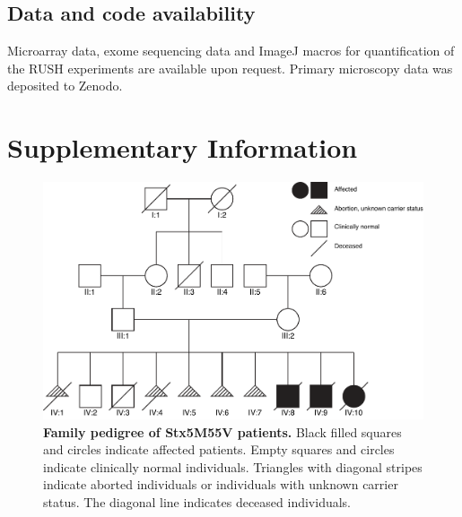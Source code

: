 \subsection{Data and code availability}

Microarray data, exome sequencing data and ImageJ macros for quantification of the RUSH experiments are available upon request. Primary microscopy data was deposited to Zenodo.

\clearpage

\section{Supplementary Information}

\begin{figure}[h]
    \centering
    \includegraphics[keepaspectratio=true,width=\linewidth]{chapters/chapter6/chapter6_SupplementaryFigure1.pdf}
    \caption{\textbf{Family pedigree of Stx5M55V patients.} Black filled squares and circles indicate affected patients. Empty squares and circles indicate clinically normal individuals. Triangles with diagonal stripes indicate aborted individuals or individuals with unknown carrier status. The diagonal line indicates deceased individuals.}
    \label{fig:ch6supfig1}
\end{figure}

\clearpage

